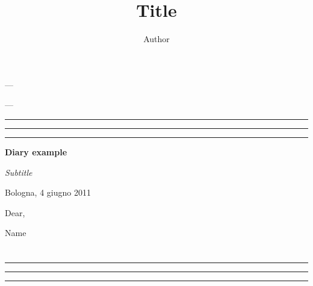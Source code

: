 \documentclass[a4paper,12pt,oneside]{memoir}
\begin{document}
\frontmatter
\title{Title}
\author{Author}
\date{}
\maketitle

\mainmatter

\pagestyle{plain}


\begin{Spacing}{1.2}

\chapter{}

\noindent
\lipsum[1-2]

— \lipsum[3]

\lipsum[4]

— \lipsum[5]

\plainbreak{2}
\renewcommand{\pfbreakdisplay}{\ding{167}\quad\ding{167}\quad\ding{167}}\fancybreak{\pfbreakdisplay}
\plainbreak{2}

\begin{center}
\textbf{Diary example}
\end{center}

\begin{center}
\textit{Subtitle}
\end{center}

\begin{flushright} Bologna, 4 giugno 2011 \end{flushright}

\noindent
Dear,

\noindent
\lipsum[6-7]

\begin{flushright} Name \end{flushright}

\chapter{}

\noindent
\lipsum[8-10]

\plainbreak{2}
\renewcommand{\pfbreakdisplay}{\ding{167}\quad\ding{167}\quad\ding{167}}\fancybreak{\pfbreakdisplay}
\plainbreak{2}

\noindent
\lipsum[11-12]

\end{Spacing}

\backmatter
\end{document}
